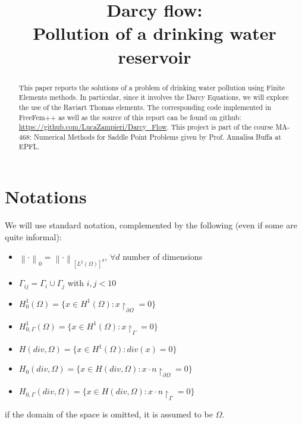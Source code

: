 \documentclass[conference]{IEEEtran}
\newcommand{\norm}[1]{\left\lVert#1\right\rVert}
\begin{document}
%
\title{Darcy flow:\\ Pollution of a drinking water reservoir}

\author{
}

\maketitle
\vspace{-10cm}

\begin{abstract}
This paper reports the solutions of a problem of drinking water pollution using Finite Elements methods. In particular, since it involves the Darcy Equations, we will explore the use of the Raviart Thomas elements. The corresponding code implemented in FreeFem++ as well as the source of this report can be found on github: \url{https://github.com/LucaZampieri/Darcy_Flow}. This project is part of the course MA-468: Numerical Methods for Saddle Point Problems given by Prof. Annalisa Buffa at EPFL.

\end{abstract}
\IEEEpeerreviewmaketitle
\section{Notations}
We will use standard notation, complemented by the following (even if some are quite informal):
\begin{itemize}
\item $\norm{\cdot}_0 = \norm{\cdot}_{[L^2(\Omega)]^d}$, $\forall d$ number of dimensions
\item $\Gamma_{ij} = \Gamma_i \cup \Gamma_j$    with $ i,j < 10$
\item $H^1_0(\Omega)= \{ x \in H^1(\Omega) : x{\restriction}_{\partial \Omega}=0 \}$
\item $H^1_{0,\Gamma}(\Omega)= \{ x \in H^1(\Omega) : x{\restriction}_{\Gamma}=0 \}$
\item $H(div,\Omega) = \{ x \in H^1(\Omega) : div(x) = 0\}$
\item $H_{0}(div,\Omega) = \{ x \in H(div,\Omega) : x\cdot n{\restriction}_{\partial \Omega} = 0\}$
\item $H_{0,\Gamma}(div,\Omega) = \{ x \in H(div,\Omega) : x\cdot n{\restriction}_\Gamma = 0\}$
\end{itemize}
if the domain of the space is omitted, it is assumed to be $\Omega$.
\end{document}
